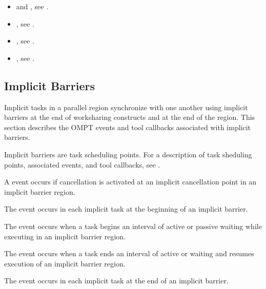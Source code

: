 \crossreferences
\begin{itemize}
\item {} and , see
.

\item {}, see
.

\item {}, see
.

\item {}, see
.

\end{itemize}






\subsection{Implicit Barriers}
\label{subsec:implict-barrier}

Implicit tasks in a parallel region synchronize with one another using
implicit barriers at the end of worksharing constructs and at the end
of the  region. This section describes the OMPT events and
tool callbacks associated with implicit barriers.

Implicit barriers are task scheduling points. For a description of
task sheduling points, associated events, and tool callbacks, see
.

\events

A  event occurs if cancellation is activated at an
implicit cancellation point in an implicit barrier region.

The  event occurs in each implicit task
at the beginning of an implicit barrier.

The  event occurs when a task begins an interval of
active or passive waiting while executing in an implicit barrier region.

The  event occurs when a task ends an interval of
active or waiting and resumes execution of an implicit barrier region.

The  event occurs in each implicit task
at the end of an implicit barrier.

